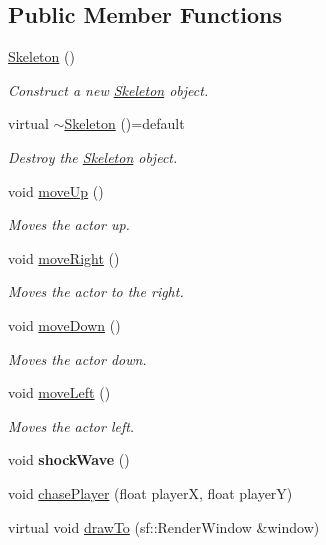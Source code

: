 \subsection*{Public Member Functions}
\begin{DoxyCompactItemize}
\item 
\mbox{\hyperlink{classSkeleton_af01a02f1ce9ae4c801cd6e66ccf7407f}{Skeleton}} ()
\begin{DoxyCompactList}\small\item\em Construct a new \mbox{\hyperlink{classSkeleton}{Skeleton}} object. \end{DoxyCompactList}\item 
virtual \mbox{\hyperlink{classSkeleton_ae6a32fa46fd502bc2f6c2cfafff24003}{$\sim$\+Skeleton}} ()=default
\begin{DoxyCompactList}\small\item\em Destroy the \mbox{\hyperlink{classSkeleton}{Skeleton}} object. \end{DoxyCompactList}\item 
void \mbox{\hyperlink{classSkeleton_a0ddbea7574ada0b5cef0cadbd4a0dd9f}{move\+Up}} ()
\begin{DoxyCompactList}\small\item\em Moves the actor up. \end{DoxyCompactList}\item 
void \mbox{\hyperlink{classSkeleton_a3d8ce7b8a1d10e4a33a27f0eee54042e}{move\+Right}} ()
\begin{DoxyCompactList}\small\item\em Moves the actor to the right. \end{DoxyCompactList}\item 
void \mbox{\hyperlink{classSkeleton_aee2055fa3d1db80392b365aa40c878bf}{move\+Down}} ()
\begin{DoxyCompactList}\small\item\em Moves the actor down. \end{DoxyCompactList}\item 
void \mbox{\hyperlink{classSkeleton_ab03c65cdabc94f280443691653112d3a}{move\+Left}} ()
\begin{DoxyCompactList}\small\item\em Moves the actor left. \end{DoxyCompactList}\item 
\mbox{\label{classSkeleton_a6113054cad95c0eefbe3c64c58027f86}} 
void {\bfseries shock\+Wave} ()
\item 
void \mbox{\hyperlink{classSkeleton_aefa4683beb507bafaa2b20eaba4f478d}{chase\+Player}} (float playerX, float playerY)
\item 
virtual void \mbox{\hyperlink{classSkeleton_aa39ac09590a5274536dc2fc125cc62e6}{draw\+To}} (sf\+::\+Render\+Window \&window)
\end{DoxyCompactItemize}
